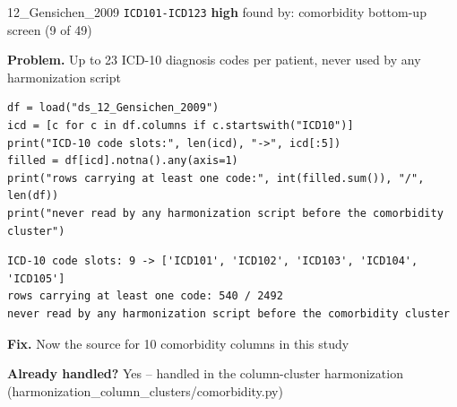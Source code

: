 \documentclass[9pt, t, handout]{beamer}
\newcommand{\ans}[1]{\textcolor{structure.fg}{#1}}
\begin{document}
\begin{frame}[fragile]{12\_Gensichen\_2009 \quad \texttt{ICD101-ICD123}}
  {\scriptsize\textcolor{orange!80!black}{\textbf{high}} \quad
   found by: comorbidity bottom-up screen \quad (9 of 49)}
  \vspace{3pt}

  {\footnotesize \textbf{Problem.} Up to 23 ICD-10 diagnosis codes per patient, never used by any harmonization script}
  \vspace{4pt}

  \begin{Verbatim}[fontsize=\tiny, frame=single, framesep=2pt, label=\tiny reproduce]
df = load("ds_12_Gensichen_2009")
icd = [c for c in df.columns if c.startswith("ICD10")]
print("ICD-10 code slots:", len(icd), "->", icd[:5])
filled = df[icd].notna().any(axis=1)
print("rows carrying at least one code:", int(filled.sum()), "/", len(df))
print("never read by any harmonization script before the comorbidity cluster")
  \end{Verbatim}
  \begin{Verbatim}[fontsize=\tiny, frame=single, framesep=2pt, label=\tiny output]
ICD-10 code slots: 9 -> ['ICD101', 'ICD102', 'ICD103', 'ICD104', 'ICD105']
rows carrying at least one code: 540 / 2492
never read by any harmonization script before the comorbidity cluster
  \end{Verbatim}
  \vspace{2pt}

  {\footnotesize \textbf{Fix.} Now the source for 10 comorbidity columns in this study}
  \vspace{2pt}

  {\footnotesize \textbf{Already handled?} \ans{Yes} -- handled in the column-cluster harmonization
   (harmonization\_column\_clusters/comorbidity.py)}
\end{frame}
\end{document}
